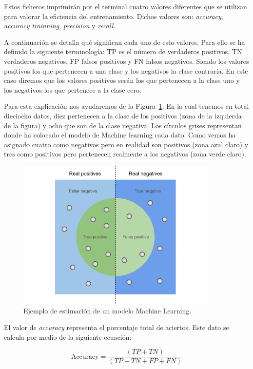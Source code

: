 \documentclass[a4paper, 12pt]{book}
\begin{document}
Estos ficheros imprimirán por el terminal cuatro valores diferentes que se utilizan para valorar la eficiencia del entrenamiento. Dichos valores son: \textit{accuracy}, \textit{accuracy trainning}, \textit{precision} y \textit{recall}. 

A continuación se detalla qué significan cada uno de esto valores. Para ello se ha definido la siguiente terminología: TP es el número de verdaderos positivos, TN verdaderos negativos, FP falsos positivos y FN falsos negativos. Siendo los valores positivos los que pertenecen a una clase y los negativos la clase contraria. En este caso diremos que los valores positivos serán los que pertenecen a la clase uno y los negativos los que pertenece a la clase cero. 

Para esta explicación nos ayudaremos de la Figura~\ref{fig:explicacion_acc}. En la cual tenemos en total dieciocho datos, diez pertenecen a la clase de los positivos (zona de la izquierda de la figura) y ocho que son de la clase negativa. Los círculos grises representan donde ha colocado el modelo de Machine learning cada dato. Como vemos ha asignado cuatro como negativos pero en realidad son positivos (zona azul claro) y tres como positivos pero pertenecen realmente a los negativos (zona verde claro).

\begin{figure}[]
  \centering
  \includegraphics[width=10cm, keepaspectratio]{img/explicacion_acc.png}
  \caption{Ejemplo de estimación de un modelo Machine Learning.}\label{fig:explicacion_acc}
\end{figure}

El valor de \textit{accuracy} representa el porcentaje total de aciertos. Este dato se calcula por medio de la siguiente ecuación:

\begin{equation}
 \boxed{\mbox{Accuracy} = \frac{(TP + TN)}{(TP + TN + FP + FN)}}
\end{equation}
\end{document}
